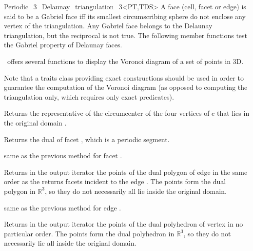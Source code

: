 \begin{ccRefClass}{Periodic_3_Delaunay_triangulation_3<PT,TDS>}
A face (cell, facet or edge) is said to be a Gabriel face iff
its smallest circumscribing sphere do not enclose
any vertex of the triangulation.  Any Gabriel face belongs to the
Delaunay triangulation, but the reciprocal is not true.
The following member functions test the Gabriel property of
Delaunay faces.
\ccGlue 
{}
\ccGlue 
{}
\ccGlue
{} {}


\cgal\ offers several functions to display the Voronoi diagram of 
a set of points in 3D.


Note that a traits class providing exact constructions should be used
in order to guarantee the computation of the Voronoi diagram (as
opposed to computing the triangulation only, which requires only exact
predicates). 


{Returns the representative of the circumcenter of the four vertices
  of c that lies in the original domain .}

{Returns the dual of facet , which is a periodic segment.}

{same as the previous method for facet .
}

{Returns in the output iterator the points of the dual polygon of
  edge  in the same order as the  returns
  facets incident to the edge . The points form the dual polygon
  in $\mathbb R^3$, so they do not necessarily all lie inside the
  original domain.}

{same as the previous method for edge .
}

{Returns in the output iterator the points of the dual polyhedron of
  vertex  in no particular order. The points form the dual
  polyhedron in $\mathbb R^3$, so they do not necessarily lie all
  inside the original domain.}


\end{ccRefClass}
